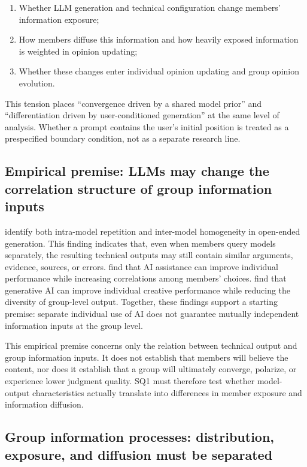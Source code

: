 \documentclass[11pt,a4paper]{article}
\begin{document}
\begin{enumerate}
\item Whether LLM generation and technical configuration change members' information exposure;
\item How members diffuse this information and how heavily exposed information is weighted in opinion updating;
\item Whether these changes enter individual opinion updating and group opinion evolution.
\end{enumerate}

This tension places ``convergence driven by a shared model prior'' and ``differentiation driven by user-conditioned generation'' at the same level of analysis. Whether a prompt contains the user's initial position is treated as a prespecified boundary condition, not as a separate research line.

\subsection{Empirical premise: LLMs may change the correlation structure of group information inputs}

\citet{jiang2025} identify both intra-model repetition and inter-model homogeneity in open-ended generation. This finding indicates that, even when members query models separately, the resulting technical outputs may still contain similar arguments, evidence, sources, or errors. \citet{fugener2021} find that AI assistance can improve individual performance while increasing correlations among members' choices. \citet{doshi2024} find that generative AI can improve individual creative performance while reducing the diversity of group-level output. Together, these findings support a starting premise: separate individual use of AI does not guarantee mutually independent information inputs at the group level.

This empirical premise concerns only the relation between technical output and group information inputs. It does not establish that members will believe the content, nor does it establish that a group will ultimately converge, polarize, or experience lower judgment quality. SQ1 must therefore test whether model-output characteristics actually translate into differences in member exposure and information diffusion.

\subsection{Group information processes: distribution, exposure, and diffusion must be separated}
\end{document}
